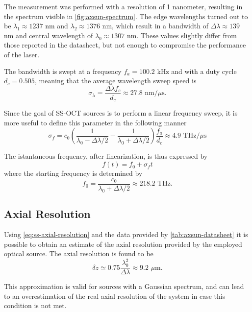 The measurement was performed with a resolution of 1 nanometer, resulting in the spectrum visible in \autoref{fig:axsun-spectrum}. The edge wavelengths turned out to be $\lambda_1 \approx 1237$ nm and $\lambda_2\approx1376$ nm, which result in a bandwidth of $\Delta \lambda \approx 139$ nm and central wavelength of $\lambda_0\approx 1307$ nm. These values slightly differ from those reported in the datasheet, but not enough to compromise the performance of the laser. 

The bandwidth is swept at a frequency $f_a = 100.2$ kHz and with a duty cycle $d_c=0.505$, meaning that the average wavelength sweep speed is 
\begin{equation}
\sigma_{\lambda} = \frac{\Delta\lambda f_c}{d_c} \approx 27.8 \,\,\text{nm}/\mu\text{s}.
\end{equation}

Since the goal of SS-OCT sources is to perform a linear frequency sweep, it is more useful to define this parameter in the following manner
\begin{equation}\label{eq:sweep-speed}
\sigma_f = c_0 \left(	\frac{1}{\lambda_0 - \Delta\lambda/2} - \frac{1}{\lambda_0 + \Delta\lambda/2}\right) \frac{f_a}{d_c} \approx 4.9 \,\,\text{THz}/\mu\text{s}
\end{equation}

The istantaneous frequency, after linearization, is thus expressed by 
\begin{equation}
	f(t) = f_0 + \sigma_f t
\end{equation}
where the starting frequency is determined by
\begin{equation}
f_0 = \frac{c_0}{\lambda_0 + \Delta\lambda /2} \approx 218.2 \,\,\text{THz}.
\end{equation}

\subsection{Axial Resolution}
Using \autoref{eq:ss-axial-resolution} and the data provided by \autoref{tab:axsun-datasheet} it is possible to obtain an estimate of the axial resolution provided by the employed optical source. The axial resolution is found to be
\begin{equation}
\delta z \simeq 0.75 \frac{\lambda_0^2}{\Delta \lambda} \approx 9.2 \,\, \mu\text{m.}
\end{equation}

This approximation is valid for sources with a Gaussian spectrum, and can lead to an overestimation of the real axial resolution of the system in case this condition is not met. 

